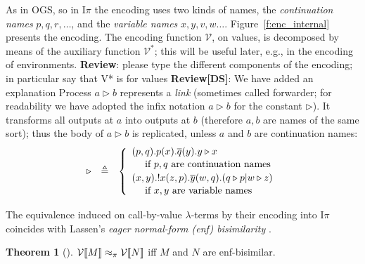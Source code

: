 \documentclass[11pt,a4paper]{amsart}
\theoremstyle{plain}
\theoremstyle{definition}
\theoremstyle{defC}
\theoremstyle{thmC}
\newtheorem{thmC}[thm]{Theorem}
\theoremstyle{plain}
\numberwithin{equation}{section}
\def\inp#1#2{#1(#2)}
\def\bout#1#2{\overline{#1}(#2)}   %
\def\abs#1{(#1). }                    %
\def\abs#1#2{(#1). #2}                    %
\newcommand{\rmm}[1]{{\tt{\lowercase{#1}}}}
\newcommand{\genwb}[1]{\mathrel{\approx_{\rmm{\lowercase{#1}}}}}       %
\newcommand{\wbPI}{\genwb{\pi}}       %
\newcommand{\tilz}{\tilde{z}}
\newcommand{\tilw}{\tilde{w}}
\newcommand{\cbvSymb}{{\mathcal {V}}}
\newcommand{\enca}[1]{\cbvSymb[\![#1]\!]}
\newcommand{\variant}{*} %
\newcommand{\fwdsymb}{\triangleright}
\newcommand{\fwd}[2]{#1\fwdsymb #2}
\newcommand{\myptD}{2pt}
\newcommand{\myptSmall}{1pt}
\newcommand{\Intp}{\mbox{I$\pi$}\xspace}   %
\newcommand{\piI}{\Intp}   %
\newcommand{\defeq}{\mathrel{\triangleq}}
\theoremstyle{plain}
\theoremstyle{definition}
\newcommand{\reviewComment}[1]{\textbf{Review}: {\color{red} #1}}
\newcommand{\reviewCommentDS}[1]{\textbf{Review[DS]}: {\color{green} #1}}
\newcommand{\reviewComment}[1]{}
\newcommand{\reviewCommentDS}[1]{}
\begin{document}
As in OGS, so in \piI 
the encoding uses 
two kinds of names, 
the \emph{continuation names} $p,q,r,\dots$, and 
the \emph{variable names} $x,y,v,w\dots$.
%
Figure~\ref{f:enc_internal} presents the encoding.
The encoding function $\cbvSymb$, on values, is decomposed by means of the auxiliary
function  $\cbvSymb^\variant$; this will be useful later, e.g., in the encoding of
environments. 
\reviewComment{please type the different
components of the encoding; in particular say that V* is for values}
\reviewCommentDS{We have added an explanation}
Process   $\fwd ab$  represents a \emph{link} (sometimes called forwarder; 
for readability we have adopted the infix
notation $\fwd ab$ for the constant $\fwd{}{}$). It 
transforms all outputs at $a$ into outputs at 
$b$ (therefore $a,b$ are
names of the same sort); thus the body of $\fwd ab$ is replicated,
 unless $a$ and $b$ are {continuation names}:
 $$\begin{array}{rcl}
 \fwd{}{} &\defeq &
 \left\{ \begin{array}{ll}
 \abs{p,q} \inp p {x}.\bout {q} {y}
           . {\fwd{ y}{ x}}\\[\myptSmall] 
 \multicolumn{1}{l}{  
        ~\quad  \mbox{if $p,q$ are continuation names}
                    }              \\[\myptD]
 \abs{x,y} ! \inp x {z,p}.\bout y {w,q}
           .({\fwd{ q}{ p}}|\fwd w z)  
\\[\myptSmall]
 \multicolumn{1}{l}{  
           ~\quad \mbox{if $x,y$ are variable names}
 }\end{array} \right. 
 \end{array}
  $$



The equivalence induced on call-by-value  $\lambda$-terms by their encoding into \piI 
coincides with 
Lassen's 
\emph{eager normal-form (enf) bisimilarity} \cite{lassentrees}.

\begin{thmC}[\cite{DurierHS18}]
\label{t:adrien}
$\enca M \wbPI \enca N$ iff $M$ and $N$ are enf-bisimilar. 
\end{thmC} 
\end{document}
